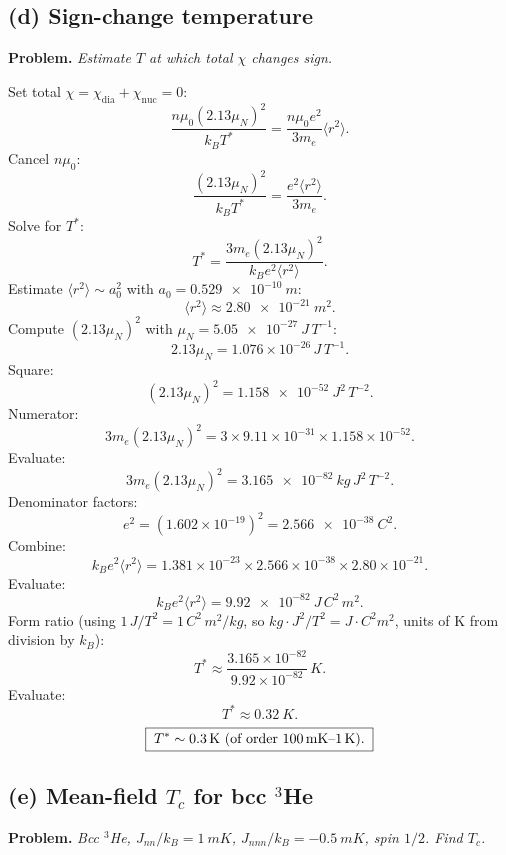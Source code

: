 \documentclass[11pt]{article}
\begin{document}
\subsection*{(d) Sign-change temperature}

\textbf{Problem.} \emph{Estimate $T$ at which total $\chi$ changes sign.}

Set total $\chi = \chi_{\text{dia}}+\chi_{\text{nuc}} = 0$:
\[
\frac{n\mu_0 (2.13\mu_N)^2}{k_B T^*} = \frac{n\mu_0 e^2}{3m_e}\langle r^2\rangle.
\]
Cancel $n\mu_0$:
\[
\frac{(2.13\mu_N)^2}{k_B T^*} = \frac{e^2 \langle r^2\rangle}{3m_e}.
\]
Solve for $T^*$:
\[
T^* = \frac{3 m_e (2.13\mu_N)^2}{k_B e^2 \langle r^2\rangle}.
\]
Estimate $\langle r^2\rangle\sim a_0^2$ with $a_0=\SI{0.529e-10}{m}$:
\[
\langle r^2\rangle \approx \SI{2.80e-21}{m^2}.
\]
Compute $(2.13\mu_N)^2$ with $\mu_N=\SI{5.05e-27}{J\,T^{-1}}$:
\[
2.13\mu_N = 1.076\times 10^{-26}\,\si{J\,T^{-1}}.
\]
Square:
\[
(2.13\mu_N)^2 = \SI{1.158e-52}{J^2\,T^{-2}}.
\]
Numerator:
\[
3 m_e (2.13\mu_N)^2 = 3\times 9.11\times 10^{-31}\times 1.158\times 10^{-52}.
\]
Evaluate:
\[
3 m_e (2.13\mu_N)^2 = \SI{3.165e-82}{kg\,J^2\,T^{-2}}.
\]
Denominator factors:
\[
e^2 = (1.602\times 10^{-19})^2 = \SI{2.566e-38}{C^2}.
\]
Combine:
\[
k_B e^2 \langle r^2\rangle = 1.381\times 10^{-23}\times 2.566\times 10^{-38}\times 2.80\times 10^{-21}.
\]
Evaluate:
\[
k_B e^2 \langle r^2\rangle = \SI{9.92e-82}{J\,C^2\,m^2}.
\]
Form ratio (using $1\,\si{J/T^2} = 1\,\si{C^2\,m^2/kg}$, so $kg \cdot J^2/T^2 = J\cdot C^2 m^2$, units of K from division by $k_B$):
\[
T^* \approx \frac{3.165\times 10^{-82}}{9.92\times 10^{-82}}\,\si{K}.
\]
Evaluate:
\[
T^* \approx \SI{0.32}{K}.
\]
\[
\boxed{\;T^* \sim \SI{0.3}{K}\ \text{(of order 100\,mK--1\,K).}\;}
\]

\subsection*{(e) Mean-field $T_c$ for bcc $^3$He}

\textbf{Problem.} \emph{Bcc $^3$He, $J_{nn}/k_B=\SI{1}{mK}$, $J_{nnn}/k_B=-\SI{0.5}{mK}$, spin $1/2$. Find $T_c$.}
\end{document}
